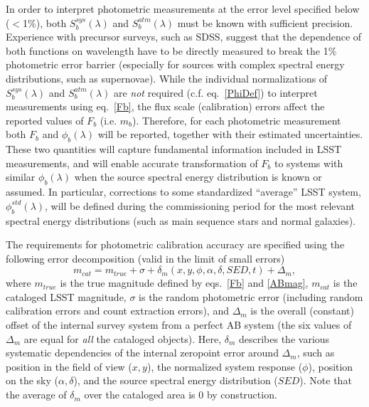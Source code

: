 In order to interpret photometric measurements at the error level
specified below ($<$1\%), both $S_b^{sys}(\lambda)$ and $S_b^{atm}(\lambda)$
must be known with sufficient precision. Experience with precursor surveys,
such as SDSS, suggest that the dependence of both functions on
wavelength have to be directly measured to break the 1\% photometric error
barrier (especially for sources with complex spectral energy distributions,
such as supernovae). While the individual normalizations of $S_b^{sys}(\lambda)$ and
$S_b^{atm}(\lambda)$ are \textit{not} required (c.f. eq.~\ref{PhiDef}) to
interpret measurements using eq.~\ref{Fb}, the flux scale (calibration)
errors affect the reported values of $F_b$ (i.e. $m_b$). Therefore,
for each photometric measurement both $F_b$ and $\phi_b(\lambda)$
will be reported, together with their estimated uncertainties. These
two quantities will capture fundamental information included in LSST
measurements, and will enable accurate transformation of $F_b$
to systems with similar $\phi_b(\lambda)$ when the source spectral
energy distribution is known or assumed. In particular, corrections
to some standardized ``average'' LSST system, $\phi_b^{std}(\lambda)$,
will be defined during the commissioning period for the most relevant
spectral energy distributions (such as main sequence stars and normal
galaxies).




The requirements for photometric calibration accuracy are specified using
the following error decomposition (valid in the limit of small errors)
\begin{equation}
\label{photoSysErr}
 m_{cat} = m_{true} + \sigma + \delta_m(x,y,\phi,\alpha,\delta,SED,t) + \Delta_m,
\end{equation}
where $m_{true}$ is the true magnitude defined by eqs.~\ref{Fb} and
\ref{ABmag}, $m_{cat}$ is the cataloged LSST magnitude, $\sigma$ is the random
photometric error (including random calibration errors and count extraction
errors), and $\Delta_m$ is the overall (constant) offset of the
internal survey system from a perfect AB system (the six values of $\Delta_m$
are equal for \textit{all} the cataloged objects). Here, $\delta_m$ describes
the various systematic dependencies of the internal zeropoint error around
$\Delta_m$, such as position in the field of view ($x,y$), the normalized
system response ($\phi$), position on the sky ($\alpha, \delta$), and
the source spectral energy distribution ($SED$). Note that the average of
$\delta_m$ over the cataloged area is 0 by construction.

